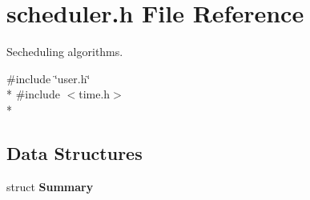 \section{scheduler.\+h File Reference}
\label{scheduler_8h}


Secheduling algorithms.  


{\ttfamily \#include \char`\"{}user.\+h\char`\"{}}\\*
{\ttfamily \#include $<$time.\+h$>$}\\*
\subsection*{Data Structures}
\begin{DoxyCompactItemize}
\item 
struct {\bf Summary}
\end{DoxyCompactItemize}
